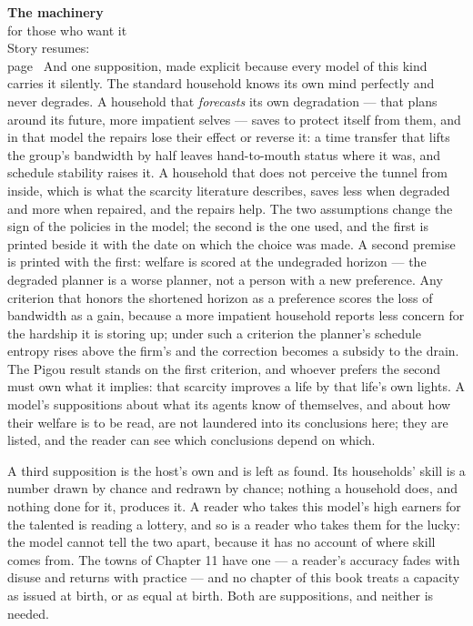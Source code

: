 \begin{machinery}{\textbf{The machinery}\\for those who want it\\[3pt]{\color{muted}Story resumes:\\page~\pageref{ch15}}}
And one supposition, made explicit because every model of this kind
carries it silently. The standard household knows its own mind
perfectly and never degrades. A household that \emph{forecasts} its own
degradation --- that plans around its future, more impatient selves ---
saves to protect itself from them, and in that model the repairs lose
their effect or reverse it: a time transfer that lifts the group's
bandwidth by half leaves hand-to-mouth status where it was, and
schedule stability raises it. A household
that does not perceive the tunnel from inside, which is what the
scarcity literature describes, saves less when degraded and more
when repaired, and the repairs help. The two assumptions change
the sign of the policies in the model; the second is the one used, and
the first is printed beside it with the date on which the choice was
made. A second premise is printed with the first: welfare is scored at
the undegraded horizon --- the degraded planner is a worse planner, not
a person with a new preference. Any criterion that honors the
shortened horizon as a preference scores the loss of bandwidth as a
gain, because a more impatient household reports less concern for
the hardship it is storing up; under such a criterion the planner's
schedule entropy rises above the firm's and the correction becomes a
subsidy to the drain. The Pigou result stands on the first criterion,
and whoever prefers the second must own what it implies: that
scarcity improves a life by that life's own lights. A model's
suppositions about what its agents know of themselves, and about how
their welfare is to be read, are not laundered into its conclusions
here; they are listed, and the reader can see which conclusions
depend on which.

A third supposition is the host's own and is left as found. Its
households' skill is a number drawn by chance and redrawn by chance;
nothing a household does, and nothing done for it, produces it. A
reader who takes this model's high earners for the talented is reading
a lottery, and so is a reader who takes them for the lucky: the model
cannot tell the two apart, because it has no account of where skill
comes from. The towns of Chapter 11 have one --- a reader's accuracy
fades with disuse and returns with practice --- and no chapter of this
book treats a capacity as issued at birth, or as equal at birth. Both
are suppositions, and neither is needed.


\end{machinery}
